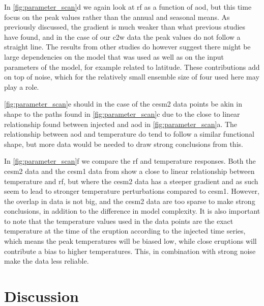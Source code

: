 \documentclass{ametsocV6.1}
\newcommand{\iso}[1][i]{{#1}njected \ce{SO2}}
\begin{document}
In \ref{fig:parameter_scan}d we again look at \gls{rf} as a function of \gls{aod}, but
this time focus on the peak values rather than the annual and seasonal means. As
previously discussed, the gradient is much weaker than what previous studies have found,
and in the case of our \gls{c2w} data the peak values do not follow a straight line. The
results from other studies \citep{jones2005, ottobliesner2016, timmreck2010} do however
suggest there might be large dependencies on the model that was used as well as on the
input parameters of the model, for example related to latitude. These contributions add
on top of noise, which for the relatively small ensemble size of four used here may play
a role.

\ref{fig:parameter_scan}e should in the case of the \gls{cesm2} data points be akin in
shape to the paths found in \ref{fig:parameter_scan}c due to the close to linear
relationship found between \iso{} and \gls{aod} in \ref{fig:parameter_scan}a. The
relationship between \gls{aod} and temperature do tend to follow a similar functional
shape, but more data would be needed to draw strong conclusions from this.

In \ref{fig:parameter_scan}f we compare the \gls{rf} and temperature responses. Both the
\gls{cesm2} data and the \gls{cesm1} data from \citet{ottobliesner2016} show a close to
linear relationship between temperature and \gls{rf}, but where the \gls{cesm2} data has
a steeper gradient and as such seem to lead to stronger temperature perturbations
compared to \gls{cesm1}. However, the overlap in data is not big, and the \gls{cesm2}
data are too sparse to make strong conclusions, in addition to the difference in model
complexity. It is also important to note that the temperature values used in the
\citet{ottobliesner2016} data points are the exact temperature at the time of the
eruption according to the \iso{} time series, which means the peak temperatures will be
biased low, while close eruptions will contribute a bias to higher temperatures. This,
in combination with strong noise make the data less reliable.

\section{Discussion}\label{sec:discussion}

\end{document}
